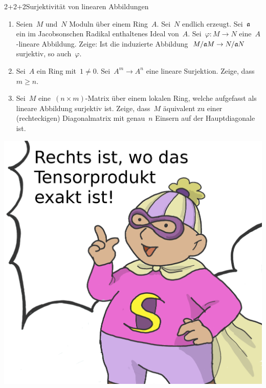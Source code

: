 \documentclass{uebblatt}
\begin{document}
\begin{aufgabe}{2+2+2}{Surjektivität von linearen Abbildungen}
\begin{enumerate}
\item Seien~$M$ und~$N$ Moduln über einem Ring~$A$. Sei~$N$ endlich
erzeugt. Sei~$\mathfrak{a}$ ein im Jacobsonschen Radikal enthaltenes Ideal von~$A$.
Sei~$\varphi : M \to N$ eine~$A$-lineare Abbildung. Zeige: Ist die
induzierte Abbildung~$M/\mathfrak{a} M \to N/\mathfrak{a} N$ surjektiv, so auch~$\varphi$.
\item Sei~$A$ ein Ring mit~$1 \neq 0$. Sei~$A^m \to A^n$ eine lineare
Surjektion. Zeige, dass~$m \geq n$.
\item Sei~$M$ eine~$(n \times m)$-Matrix über einem lokalen Ring, welche
aufgefasst als lineare Abbildung surjektiv ist. Zeige, dass~$M$ äquivalent zu einer
(rechteckigen) Diagonalmatrix mit genau~$n$ Einsern auf der Hauptdiagonale ist.
\end{enumerate}
\end{aufgabe}

\centering
\includegraphics[scale=0.08]{images/rechts-ist-wo-das-tensorprodukt-exakt-ist}
\end{document}
